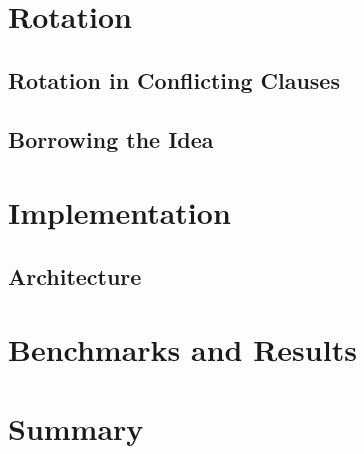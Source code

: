 \documentclass[]{article}
\begin{document}
\section{Rotation}
\subsection{Rotation in Conflicting Clauses}
\subsection{Borrowing the Idea}

\section{Implementation}
\subsection{Architecture}

\section{Benchmarks and Results}

\section{Summary}
\end{document}
